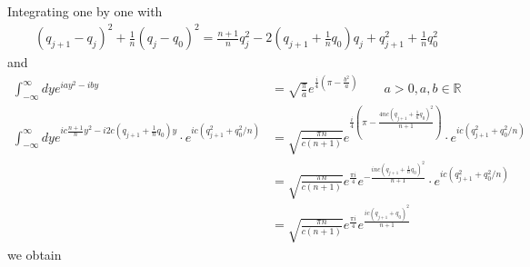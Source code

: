 \documentclass[10pt,a4paper]{article}
\theoremstyle{definition}
\begin{document}
Integrating one by one with
\begin{align}
 (q_{j+1}-q_j)^2+\frac{1}{n}(q_j-q_0)^2=\frac{n+1}{n}q_j^2-2\left(q_{j+1}+\frac{1}{n}q_0\right)q_j+q_{j+1}^2+\frac{1}{n}q_0^2   
\end{align}
and
\begin{align}
 \int_{-\infty}^\infty dy e^{iay^2-iby}&=\sqrt{\frac{\pi}{a}}e^{\frac{i}{4}\left(\pi-\frac{b^2}{a}\right)} \qquad a>0, a,b\in\mathbb{R}\\
 \int_{-\infty}^\infty dy e^{ic\frac{n+1}{n}y^2-i2c(q_{j+1}+\frac{1}{n}q_0)y}\cdot e^{ic(q_{j+1}^2+q_0^2/n)}&=\sqrt{\frac{\pi n}{c(n+1)}}e^{\frac{i}{4}\left(\pi-\frac{4nc(q_{j+1}+\frac{1}{n}q_0)^2}{n+1}\right)}\cdot e^{ic(q_{j+1}^2+q_0^2/n)}\\
 &=\sqrt{\frac{\pi n}{c(n+1)}}e^{\frac{\pi i}{4}}e^{-\frac{inc(q_{j+1}+\frac{1}{n}q_0)^2}{n+1}}\cdot e^{ic(q_{j+1}^2+q_0^2/n)}\\
 &=\sqrt{\frac{\pi n}{c(n+1)}}e^{\frac{\pi i}{4}}e^{\frac{ic(q_{j+1}+q_0)^2}{n+1}}
\end{align}
we obtain
\end{document}
